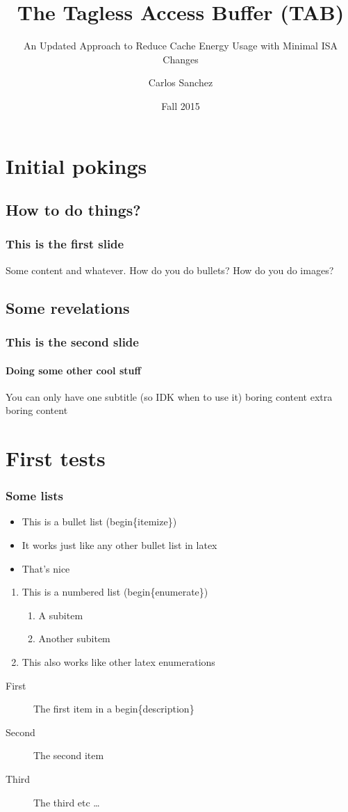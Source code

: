 \documentclass{beamer}
\title[TAB v2] %
{The Tagless Access Buffer (TAB)}
\subtitle{An Updated Approach to Reduce Cache Energy Usage with Minimal ISA Changes}
\author{Carlos Sanchez}
\institute[FSU]
{Computer Science Department\\ Florida State University}
\date{Fall 2015}
\begin{document}
 
\frame{\titlepage} 
\section{Initial pokings}
\subsection{How to do things?}
\begin{frame} 
   \frametitle{This is the first slide}
   Some content and whatever.
   How do you do bullets?
   How do you do images?
\end{frame}
\subsection{Some revelations}
\begin{frame}
   \frametitle{This is the second slide}
   \framesubtitle{Doing some other cool stuff}
   You can only have one subtitle (so IDK when to use it)
   boring content
   extra boring content
\end{frame}
\section{First tests}
\begin{frame}
   \frametitle{Some lists}
   \begin{itemize}
      \item This is a bullet list (begin\{itemize\})
      \item It works just like any other bullet list in latex
      \item That's nice
   \end{itemize}
   \begin{enumerate}
      \item This is a numbered list (begin\{enumerate\})
         \begin{enumerate}
            \item A subitem
            \item Another subitem
         \end{enumerate}
      \item This also works like other latex enumerations
   \end{enumerate}
   \begin{description}
      \item[First] The first item in a begin\{description\}
      \item[Second] The second item
      \item[Third] The third etc \ldots
   \end{description}
\end{frame}
\end{document}
